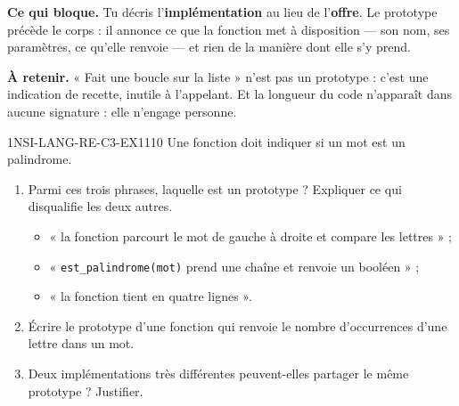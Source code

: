 

\textbf{Ce qui bloque.} Tu décris l'\textbf{implémentation} au lieu de l'\textbf{offre}. Le
prototype précède le corps : il annonce ce que la fonction met à disposition — son nom, ses
paramètres, ce qu'elle renvoie — et rien de la manière dont elle s'y prend.

\textbf{À retenir.} « Fait une boucle sur la liste » n'est pas un prototype : c'est une
indication de recette, inutile à l'appelant. Et la longueur du code n'apparaît dans aucune
signature : elle n'engage personne.

\begin{exercice}{1NSI-LANG-RE-C3-EX1}{1}{10}
Une fonction doit indiquer si un mot est un palindrome.
\begin{enumerate}
  \item Parmi ces trois phrases, laquelle est un prototype ? Expliquer ce qui disqualifie les
        deux autres.
        \begin{itemize}
          \item « la fonction parcourt le mot de gauche à droite et compare les lettres » ;
          \item « \lstinline{est_palindrome(mot)} prend une chaîne et renvoie un booléen » ;
          \item « la fonction tient en quatre lignes ».
        \end{itemize}
  \item Écrire le prototype d'une fonction qui renvoie le nombre d'occurrences d'une lettre
        dans un mot.
  \item Deux implémentations très différentes peuvent-elles partager le même prototype ?
        Justifier.
\end{enumerate}
\end{exercice}
